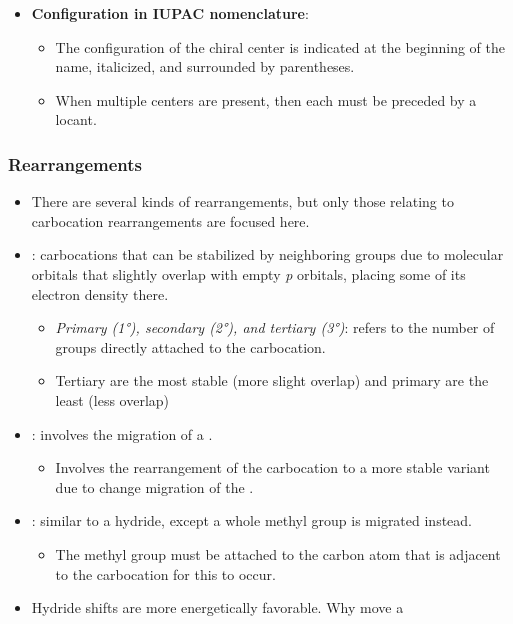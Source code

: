 \documentclass{inVerba-notes}
\begin{document}
\begin{itemize}
\begin{itemize}
    \bigskip

    \item \textbf{Configuration in IUPAC nomenclature}:
    \begin{itemize}
        \item The configuration of the chiral center is indicated at the beginning of the name, italicized, and surrounded by parentheses.
        \item When multiple centers are present, then each must be preceded by a locant.
    \end{itemize}
  \end{itemize}

  \subsubsection{Rearrangements}\label{Rearrangements}
    \begin{itemize}
        \item There are several kinds of rearrangements, but only those relating to carbocation rearrangements are focused here.
        \item {}: carbocations that can be stabilized by neighboring groups due to molecular orbitals that slightly overlap with empty \textit{p} orbitals, placing some of its electron density there.
            \begin{itemize}
                \item \emph{Primary (\ang{1}), secondary (\ang{2}), and tertiary (\ang{3})}: refers to the number of groups directly attached to the carbocation.
                \item Tertiary are the most stable (more slight overlap) and primary are the least (less overlap)
            \end{itemize}
        \item {}: involves the migration of a .
            \begin{itemize}
                \item Involves the rearrangement of the carbocation to a more stable variant due to change migration of the .
            \end{itemize}
        \item {}: similar to a hydride, except a whole methyl group is migrated instead.
            \begin{itemize}
                \item The methyl group must be attached to the carbon atom that is adjacent to the carbocation for this to occur.
            \end{itemize}
        \item Hydride shifts are more energetically favorable. Why move a 
    \end{itemize}
\end{itemize}
\end{document}
